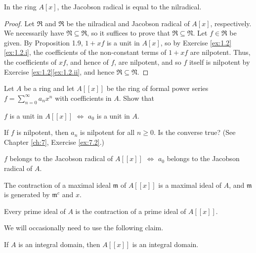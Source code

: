 \begin{exercise}
\label{ex:1.4}
In the ring $A[x]$, the Jacobson radical is equal to the nilradical.
\end{exercise}

\begin{proof}
Let $\mathfrak R$ and $\mathfrak R$ be the nilradical and Jacobson radical of $A[x]$, respectively.
We necessarily have $\mathfrak N \subseteq \mathfrak R$, so it suffices to prove that $\mathfrak R \subseteq \mathfrak N$.
Let $f \in \mathfrak R$ be given.
By Proposition 1.9, $1 + x f$ is a unit in $A[x]$, so by Exercise \ref{ex:1.2}\ref{ex:1.2.i}, the coefficients of the non-constant terms of $1 + x f$ are nilpotent.
Thus, the coefficients of $x f$, and hence of $f$, are nilpotent, and so $f$ itself is nilpotent by Exercise \ref{ex:1.2}\ref{ex:1.2.ii}, and hence $\mathfrak R \subseteq \mathfrak N$.
\end{proof}





\begin{exercise}
\label{ex:1.5}
Let $A$ be a ring and let $A[[x]]$ be the ring of formal power series $f = \sum_{n=0}^\infty a_n x^n$ with coefficients in $A$.
Show that
\begin{rlist}
\item
\label{ex:1.5.i}
$f$ is a unit in $A[[x]]$ $\iff$ $a_0$ is a unit in $A$.
\item
\label{ex:1.5.ii}
If $f$ is nilpotent, then $a_n$ is nilpotent for all $n\geq 0$.
Is the converse true?
(See Chapter \ref{ch:7}, Exercise \ref{ex:7.2}.)
\item
\label{ex:1.5.iii}
$f$ belongs to the Jacobson radical of $A[[x]]$ $\iff$ $a_0$ belongs to the Jacobson radical of $A$.
\item
\label{ex:1.5.iv}
The contraction of a maximal ideal $\mathfrak m$ of $A[[x]]$ is a maximal ideal of $A$, and $\mathfrak m$ is generated by $\mathfrak m^c$ and $x$.
\item
\label{ex:1.5.v}
Every prime ideal of $A$ is the contraction of a prime ideal of $A[[x]]$.
\end{rlist}
\end{exercise}

\noindent
We will occasionally need to use the following claim.

\begin{claim}
\label{claim:1.5.power series integral domain}
If $A$ is an integral domain, then $A[[x]]$ is an integral domain.
\end{claim}

